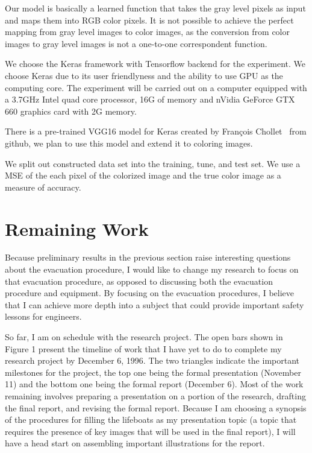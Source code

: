 \documentclass[12pt]{article}
\begin{document}
Our model is basically a learned function that takes the gray level pixels as input and maps them into RGB color pixels. It is not possible to achieve the perfect mapping from gray level images to color images, as the conversion from color images to gray level images is not a one-to-one correspondent function. 


We choose the Keras framework with Tensorflow backend for the experiment. We choose Keras due to its user friendlyness and the ability to use GPU as the computing core. The experiment will be carried out on a computer equipped with a 3.7GHz Intel quad core processor, 16G of memory and nVidia GeForce GTX 660 graphics card with 2G memory.  


There is a pre-trained VGG16 model for Keras created by François Chollet~\cite{VGG16} from github, we plan to use this model and extend it to coloring images. 


We split out constructed data set into the training, tune, and test set. We use a MSE of the each pixel of the colorized image and the true color image as a measure of accuracy. 


\section{Remaining Work}

Because preliminary results in the previous section raise interesting questions about the evacuation procedure, I would like to change my research to focus on that evacuation procedure, as opposed to discussing both the evacuation procedure and equipment. By focusing on the evacuation procedures, I believe that I can achieve more depth into a subject that could provide important safety lessons for engineers. 


So far, I am on schedule with the research project. The open bars shown in Figure 1 present the timeline of work that I have yet to do to complete my research project by December 6, 1996. The two triangles indicate the important milestones for the project, the top one being the formal presentation (November 11) and the bottom one being the formal report (December 6). Most of the work remaining involves preparing a presentation on a portion of the research, drafting the final report, and revising the formal report. Because I am choosing a synopsis of the procedures for filling the lifeboats as my presentation topic (a topic that requires the presence of key images that will be used in the final report), I will have a head start on assembling important illustrations for the report.
\end{document}
